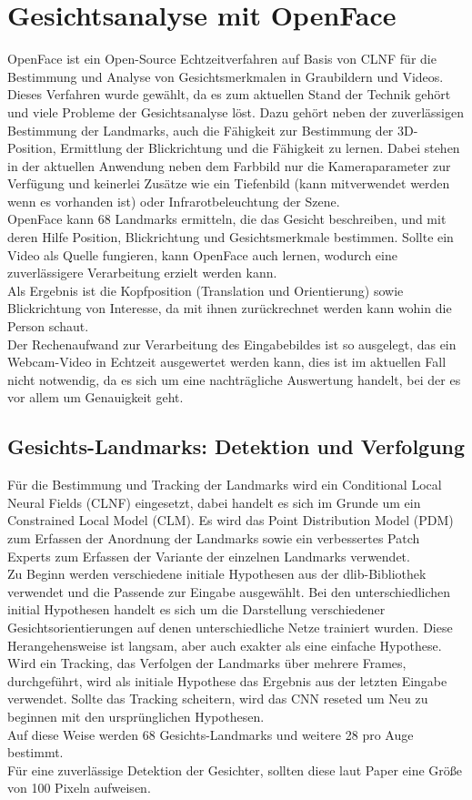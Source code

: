 \section{Gesichtsanalyse mit OpenFace}
\label{OpenFace}
OpenFace ist ein Open-Source Echtzeitverfahren auf Basis von CLNF für die Bestimmung und Analyse von Gesichtsmerkmalen in Graubildern und Videos. Dieses Verfahren wurde gewählt, da es zum aktuellen Stand der Technik gehört und viele Probleme der Gesichtsanalyse löst. Dazu gehört neben der zuverlässigen Bestimmung der Landmarks, auch die Fähigkeit zur Bestimmung der 3D-Position, Ermittlung der Blickrichtung und die Fähigkeit zu lernen. Dabei stehen in der aktuellen Anwendung neben dem Farbbild nur die Kameraparameter zur Verfügung und keinerlei Zusätze wie ein Tiefenbild (kann mitverwendet werden wenn es vorhanden ist) oder Infrarotbeleuchtung der Szene.\\
OpenFace kann 68 Landmarks ermitteln, die das Gesicht beschreiben, und mit deren Hilfe Position, Blickrichtung und Gesichtsmerkmale bestimmen. Sollte ein Video als Quelle fungieren, kann OpenFace auch lernen, wodurch eine zuverlässigere Verarbeitung erzielt werden kann.\\
Als Ergebnis ist die Kopfposition (Translation und Orientierung) sowie Blickrichtung von Interesse, da mit ihnen zurückrechnet werden kann wohin die Person schaut.\\
Der Rechenaufwand zur Verarbeitung des Eingabebildes ist so ausgelegt, das ein Webcam-Video in Echtzeit ausgewertet werden kann, dies ist im aktuellen Fall nicht notwendig, da es sich um eine nachträgliche Auswertung handelt, bei der es vor allem um Genauigkeit geht.
\subsection{Gesichts-Landmarks: Detektion und Verfolgung}
Für die Bestimmung und Tracking der Landmarks wird ein Conditional Local Neural Fields (CLNF) eingesetzt, dabei handelt es sich im Grunde um ein Constrained Local Model (CLM). Es wird das Point Distribution Model (PDM) zum Erfassen der Anordnung der Landmarks sowie ein verbessertes Patch Experts zum Erfassen der Variante der einzelnen Landmarks verwendet.\\
Zu Beginn werden verschiedene initiale Hypothesen aus der dlib-Bibliothek verwendet und die Passende zur Eingabe ausgewählt. Bei den unterschiedlichen initial Hypothesen handelt es sich um die Darstellung verschiedener Gesichtsorientierungen auf denen unterschiedliche Netze trainiert wurden. Diese Herangehensweise ist langsam, aber auch exakter als eine einfache Hypothese. Wird ein Tracking, das Verfolgen der Landmarks über mehrere Frames, durchgeführt, wird als initiale Hypothese das Ergebnis aus der letzten Eingabe verwendet. Sollte das Tracking scheitern, wird das CNN reseted um Neu zu beginnen mit den ursprünglichen Hypothesen.\\
Auf diese Weise werden 68 Gesichts-Landmarks und weitere 28 pro Auge bestimmt.\\
Für eine zuverlässige Detektion der Gesichter, sollten diese laut Paper \cite{OpenFace} eine Größe von 100 Pixeln aufweisen.
